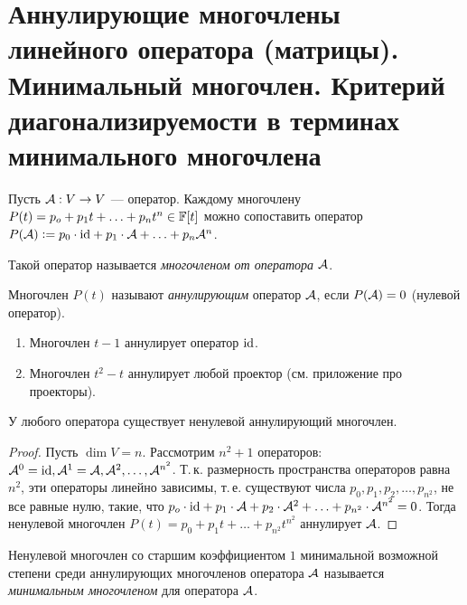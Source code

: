 \section{Аннулирующие многочлены линейного оператора (матрицы). Минимальный многочлен. Критерий диагонализируемости в терминах минимального многочлена}

Пусть $\mathcal{A}: V \to V$ --- оператор. Каждому многочлену $P(t) = p_o + p_1t + \ldots + p_nt^n \in \mathbb{F}[t]$ можно сопоставить оператор $P(\mathcal{A}) \vcentcolon = p_0 \cdot \mathrm{id} + p_1 \cdot \mathcal{A} + \ldots + p_n\mathcal{A}^n$.

\begin{definition}
    Такой оператор называется \textit{многочленом от оператора} $\mathcal{A}$.
\end{definition}

\begin{definition}
    Многочлен $P(t)$ называют \textit{аннулирующим} оператор $\mathcal{A}$, если $P(\mathcal{A}) = 0$ (нулевой оператор).
\end{definition}

\begin{example}
    \begin{enumerate}[nolistsep]
        \item Многочлен $t - 1$ аннулирует оператор $\mathrm{id}$.
        \item Многочлен $t^2 - t$ аннулирует любой проектор (см. приложение про проекторы).
    \end{enumerate}
\end{example}

\begin{proposal}
    У любого оператора существует ненулевой аннулирующий многочлен.
\end{proposal}

\begin{proof}
    Пусть $\dim V = n$. Рассмотрим $n^2 + 1$ операторов: $\mathcal{A}^0 = \mathrm{id}, \mathcal{A}^1 = \mathcal{A}, \mathcal{A}^2, \ldots, \mathcal{A}^{n^2}$. Т.\,к. размерность пространства операторов равна $n^2$, эти операторы линейно зависимы, т.\,е. существуют числа $p_0, p_1, p_2, \ldots, p_{n^2}$, не все равные нулю, такие, что $p_o \cdot \mathrm{id} + p_1 \cdot \mathcal{A} + p_2 \cdot \mathcal{A}^2 + \ldots + p_{n^2} \cdot \mathcal{A}^{n^2} = 0$. Тогда ненулевой многочлен $P(t) = p_0 + p_1t + \ldots + p_{n^2}t^{n^2}$ аннулирует $\mathcal{A}$.
\end{proof}

\begin{definition}
    Ненулевой многочлен со старшим коэффициентом $1$ минимальной возможной степени среди аннулирующих многочленов оператора $\mathcal{A}$ называется \textit{минимальным многочленом} для оператора $\mathcal{A}$.
\end{definition}

